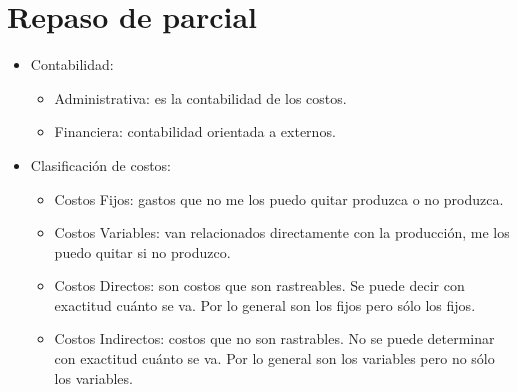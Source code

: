 \section{Repaso de parcial}
\begin{itemize}
    \item Contabilidad:
        \begin{itemize}
            \item Administrativa: es la contabilidad de los costos. 
            \item Financiera: contabilidad orientada a externos.
        \end{itemize}
    
    \item Clasificación de costos:
        \begin{itemize}
            \item Costos Fijos: gastos que no me los puedo quitar produzca o no produzca.
            \item Costos Variables: van relacionados directamente con la producción, me los puedo quitar si no produzco.
            \item Costos Directos: son costos que son rastreables. Se puede decir con exactitud cuánto se va. Por lo general son los fijos pero sólo los fijos.
            \item Costos Indirectos: costos que no son rastrables. No se puede determinar con exactitud cuánto se va. Por lo general son los variables pero no sólo los variables.
        \end{itemize}
    

\end{itemize}
